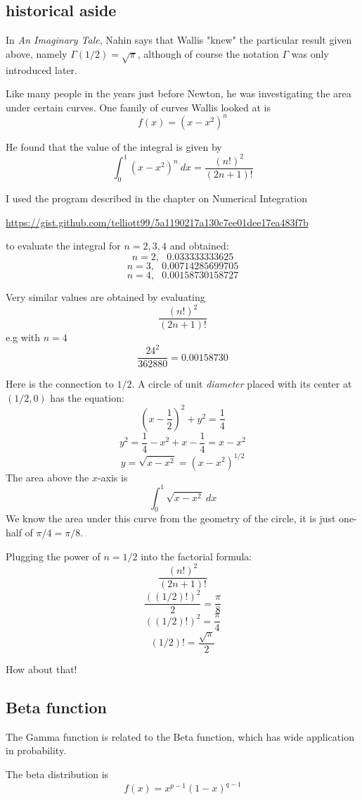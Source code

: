 \documentclass[11pt, oneside]{article}
\begin{document}
\subsection*{historical aside}
In \emph{An Imaginary Tale}, Nahin says that Wallis "knew" the particular result given above, namely $\Gamma(1/2) = \sqrt{\pi}$, although of course the notation $\Gamma$ was only introduced later.

Like many people in the years just before Newton, he was investigating the area under certain curves.  One family of curves Wallis looked at is 
\[ f(x) = (x - x^2)^n \]

He found that the value of the integral is given by
\[ \int_0^1 (x - x^2)^n \ dx = \frac{(n!)^2}{(2n + 1)!} \]

I used the program described in the chapter on Numerical Integration

\url{https://gist.github.com/telliott99/5a1190217a130c7ee01dee17ea483f7b}

 to evaluate the integral for $n=2,3,4$ and obtained:
\[ n=2, \ \ \ 0.033333333625 \]
\[ n=3, \ \ \ 0.00714285699705 \]
\[ n=4, \ \ \ 0.00158730158727 \]

Very similar values are obtained by evaluating
\[ \frac{(n!)^2}{(2n + 1)! } \]
e.g with $n=4$
\[ \frac{24^2}{362880} =  0.00158730 \]

Here is the connection to $1/2$.  A circle of unit \emph{diameter} placed with its center at $(1/2,0)$ has the equation:
\[ (x - \frac{1}{2})^2 + y^2 = \frac{1}{4} \]
\[ y^2 =  \frac{1}{4} - x^2 + x - \frac{1}{4} = x - x^2 \]
\[ y = \sqrt{x - x^2} = (x - x^2)^{1/2} \]
The area above the $x$-axis is
\[ \int_0^1 \sqrt{x - x^2} \ dx \]
We know the area under this curve from the geometry of the circle, it is just one-half of $\pi/4 = \pi/8$.

Plugging the power of $n = 1/2$ into the factorial formula:
\[ \frac{(n!)^2}{(2n + 1)!} \]
\[ \frac{((1/2)!)^2}{2} = \frac{\pi}{8} \]
\[ ((1/2)!)^2 = \frac{\pi}{4} \]
\[ (1/2)! = \frac{\sqrt{\pi}}{2} \]

How about that!

\subsection*{Beta function}
The Gamma function is related to the Beta function, which has wide application in probability.

The beta distribution is
\[ f(x) = x^{p - 1} (1 - x)^{q - 1} \]
\end{document}
